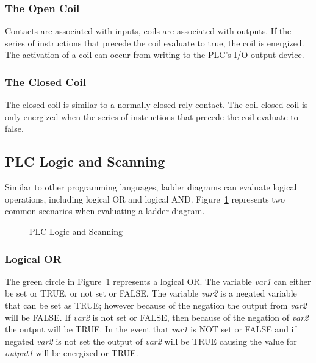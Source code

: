 \subsubsection*{The Open Coil}
Contacts are associated with inputs, coils are associated with outputs. If the series of instructions that precede the coil evaluate to true, the coil is energized. The activation of a coil can occur from writing to the PLC's I/O output device.

\subsubsection*{The Closed Coil}
The closed coil is similar to a normally closed rely contact. The coil closed coil is only energized when the series of instructions that precede the coil evaluate to false.

\subsection{PLC Logic and Scanning}
Similar to other programming languages, ladder diagrams can evaluate logical operations, including logical OR and logical AND. Figure~\ref{fig:logic} represents two common scenarios when evaluating a ladder diagram. 

\begin{figure}[!htb]
\begin{center}
\end{center}
\caption[skip=-6pt]{PLC Logic and Scanning}
\label{fig:logic}
\end{figure}

\subsubsection*{Logical OR}
The green circle in Figure~\ref{fig:logic} represents a logical OR. The variable \textit{var1} can either be set or TRUE, or not set or FALSE. The variable \textit{var2} is a negated variable that can be set as TRUE; however because of the negation the output from \textit{var2} will be FALSE.  If \textit{var2} is not set or FALSE, then because of the negation of \textit{var2} the output will be TRUE. In the event that \textit{var1} is NOT set or FALSE and if negated \textit{var2} is not set the output of \textit{var2} will be TRUE causing the value for \textit{output1} will be energized or TRUE.

